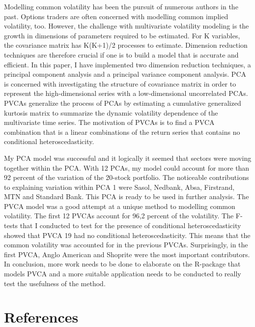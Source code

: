 \documentclass[11pt,preprint, authoryear]{elsarticle}
\numberwithin{equation}{section}
\numberwithin{figure}{section}
\numberwithin{table}{section}
\begin{document}
Modelling common volatility has been the pursuit of numerous authors in
the past. Options traders are often concerned with modelling common
implied volatility, too. However, the challenge with multivariate
volatility modeling is the growth in dimensions of parameters required
to be estimated. For K variables, the covariance matrix has K(K+1)/2
processes to estimate. Dimension reduction techniques are therefore
crucial if one is to build a model that is accurate and efficient. In
this paper, I have implemented two dimension reduction techniques, a
principal component analysis and a principal variance component
analysis. PCA is concerned with investigating the structure of
covariance matrix in order to represent the high-dimensional series with
a low-dimensional uncorrelated PCAs. PVCAs generalize the process of
PCAs by estimating a cumulative generalized kurtosis matrix to summarize
the dynamic volatility dependence of the multivariate time series. The
motivation of PVCAs is to find a PVCA combination that is a linear
combinations of the return series that contains no conditional
heteroscedasticity.

My PCA model was successful and it logically it seemed that sectors were
moving together within the PCA. With 12 PCAs, my model could account for
more than 92 percent of the variation of the 20-stock portfolio. The
noticeable contributions to explaining variation within PCA 1 were
Sasol, Nedbank, Absa, Firstrand, MTN and Standard Bank. This PCA is
ready to be used in further analysis. The PVCA model was a good attempt
at a unique method to modelling common volatility. The first 12 PVCAs
account for 96,2 percent of the volatility. The F-tests that I conducted
to test for the presence of conditional heteroscedasticity showed that
PVCA 19 had no conditional heteroscedasticity. This means that the
common volatility was accounted for in the previous PVCAs. Surprisingly,
in the first PVCA, Anglo American and Shoprite were the most important
contributors. In conclusion, more work needs to be done to elaborate on
the R-package that models PVCA and a more suitable application needs to
be conducted to really test the usefulness of the method.

\newpage

\hypertarget{references}{%
\section*{References}\label{references}}
\end{document}
